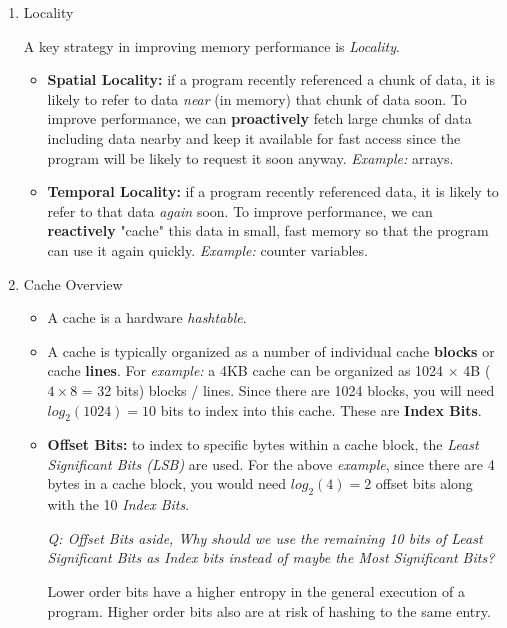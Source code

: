 \documentclass[12pt]{article}
\newenvironment{QandA}{\begin{enumerate}[label=\bfseries\arabic*.]\bfseries}
                      {\end{enumerate}}
\newenvironment{answered}{\par\quad\normalfont}{}
\begin{document}
\begin{QandA}
\item Locality
\begin{answered}
A key strategy in improving memory performance is \textit{Locality}. 
\begin{itemize}
    \item \textbf{Spatial Locality:} if a program recently referenced a chunk of data, it is likely to refer to data \textit{near} (in memory) that chunk of data soon. To improve performance, we can \textbf{proactively} fetch large chunks of data including data nearby and keep it available for fast access since the program will be likely to request it soon anyway. \textit{Example:} arrays.
    \item \textbf{Temporal Locality:} if a program recently referenced data, it is likely to refer to that data \textit{again} soon. To improve performance, we can \textbf{reactively} "cache" this data in small, fast memory so that the program can use it again quickly. \textit{Example:} counter variables.
\end{itemize}
\end{answered}

\item Cache Overview
\begin{answered}
\vspace{-0.85cm}
\begin{itemize}
    \item A cache is a hardware \textit{hashtable}.
    \item A cache is typically organized as a number of individual cache \textbf{blocks} or cache \textbf{lines}. For \textit{example:} a 4KB cache can be organized as 1024 $\times$ 4B ($4 \times 8$ = 32 bits) blocks / lines. Since there are 1024 blocks, you will need $log_{2}(1024) = 10$ bits to index into this cache. These are \textbf{Index Bits}.
    \item \textbf{Offset Bits:} to index to specific bytes within a cache block, the \textit{Least Significant Bits (LSB)} are used. For the above \textit{example}, since there are 4 bytes in a cache block, you would need $log_{2}(4)=2$ offset bits along with the 10 \textit{Index Bits}.
    
    \textit{Q: Offset Bits aside, Why should we use the remaining 10 bits of Least Significant Bits as Index bits instead of maybe the Most Significant Bits?}
    
    \quad Lower order bits have a higher entropy in the general execution of a program. Higher order bits also are at risk of hashing to the same entry.
    

\end{itemize}
\end{answered}
\end{QandA}
\end{document}
